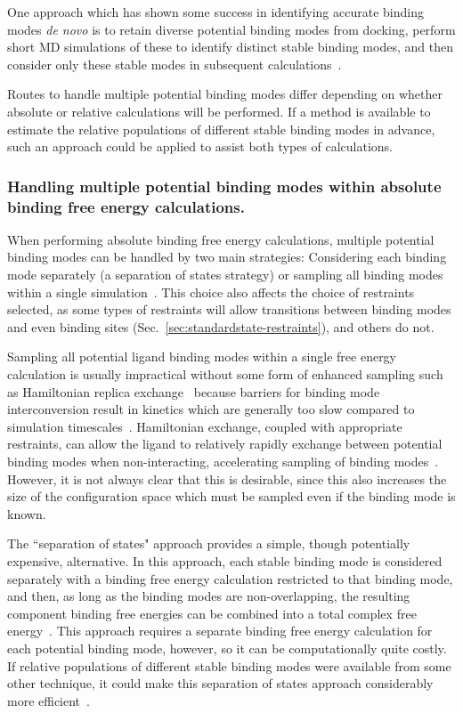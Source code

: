 \documentclass[9pt,bestpractices]{livecoms}
\begin{document}
One approach which has shown some success in identifying accurate binding modes \emph{de novo} is to retain diverse potential binding modes from docking, perform short MD simulations of these to identify distinct stable binding modes, and then consider only these stable modes in subsequent calculations~\cite{gallicchio2014virtual, mobley2006use,rocklin2013blind, boyce2009predicting, mobley2007predicting}.


Routes to handle multiple potential binding modes differ depending on whether absolute or relative calculations will be performed. If a method is available to estimate the relative populations of different stable binding modes in advance, such an approach could be applied to assist both types of calculations.

\subsubsection{Handling multiple potential binding modes within absolute binding free energy calculations.}
When performing absolute binding free energy calculations, multiple potential binding modes can be handled by two main strategies: Considering each binding mode separately (a separation of states strategy) or sampling all binding modes within a single simulation~\cite{mobley2012perspective}.
This choice also affects the choice of restraints selected, as some types of restraints will allow transitions between binding modes and even binding sites (Sec.~\ref{sec:standardstate-restraints}), and others do not.

Sampling all potential ligand binding modes within a single free energy calculation is usually impractical without some form of enhanced sampling such as Hamiltonian replica exchange~\cite{wang2013identifying} because barriers for binding mode interconversion result in kinetics which are generally too slow compared to simulation timescales~\cite{mobley2006use, palma2012computation,mobley2012perspective, gill2018binding}.
Hamiltonian exchange, coupled with appropriate restraints, can allow the ligand to relatively rapidly exchange between potential binding modes when non-interacting, accelerating sampling of binding modes~\cite{wang2013identifying}. However, it is not always clear that this is desirable, since this also increases the size of the configuration space which must be sampled even if the binding mode is known.

The ``separation of states" approach provides a simple, though potentially expensive, alternative.  In this approach, each stable binding mode is considered separately with a binding free energy calculation restricted to that binding mode, and then, as long as the binding modes are non-overlapping, the resulting component binding free energies can be combined into a total complex free energy~\cite{mobley2006use, mobley2012perspective}.
This approach requires a separate binding free energy calculation for each potential binding mode, however, so it can be computationally quite costly.
If relative populations of different stable binding modes were available from some other technique, it could make this separation of states approach considerably more efficient~\cite{mobley2012perspective, gill2018binding}.
\end{document}

